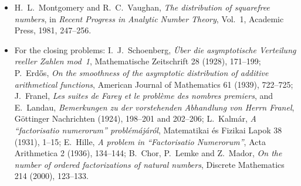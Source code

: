 \begin{itemize}
\item H.~L.~Montgomery and R.~C.~Vaughan, \emph{The distribution of squarefree numbers}, in \emph{Recent Progress in Analytic Number Theory},
Vol.~1, Academic Press, 1981, 247--256.
\item For the closing problems: I.~J.~Schoenberg, \emph{\"Uber die asymptotische Verteilung reeller Zahlen mod~1}, Mathematische Zeitschrift 28 (1928),
171--199; P.~Erd\H os, \emph{On the smoothness of the asymptotic distribution of additive arithmetical functions}, American Journal of Mathematics 61
(1939), 722--725; J.~Franel, \emph{Les suites de Farey et le probl\`eme des nombres premiers}, and E.~Landau, \emph{Bemerkungen zu der vorstehenden
Abhandlung von Herrn Franel}, G\"ottinger Nachrichten (1924), 198--201 and 202--206; L.~Kalm\'ar, \emph{A ``factorisatio numerorum'' probl\'em\'aj\'ar\'ol},
Matematikai \'es Fizikai Lapok 38 (1931), 1--15; E.~Hille, \emph{A problem in ``Factorisatio Numerorum''}, Acta Arithmetica 2 (1936), 134--144;
B.~Chor, P.~Lemke and Z.~Mador, \emph{On the number of ordered factorizations of natural numbers}, Discrete Mathematics 214 (2000), 123--133.
\end{itemize}
